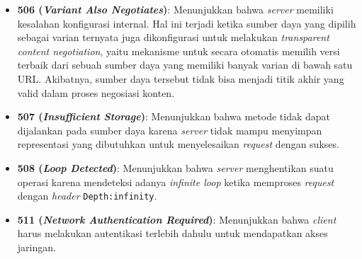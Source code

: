 \begin{itemize}
    \item \textbf{506 (\textit{Variant Also Negotiates})}: Menunjukkan bahwa \textit{server} memiliki kesalahan konfigurasi internal. Hal ini terjadi ketika sumber daya yang dipilih sebagai varian ternyata juga dikonfigurasi untuk melakukan \textit{transparent content negotiation}, yaitu mekanisme untuk secara otomatis memilih versi terbaik dari sebuah sumber daya yang memiliki banyak varian di bawah satu URL. Akibatnya, sumber daya tersebut tidak bisa menjadi titik akhir yang valid dalam proses negosiasi konten.~\cite{RFC2295}
  
    \item \textbf{507 (\textit{Insufficient Storage})}: Menunjukkan bahwa metode tidak dapat dijalankan pada sumber daya karena \textit{server} tidak mampu menyimpan representasi yang dibutuhkan untuk menyelesaikan \textit{request} dengan sukses.~\cite{RFC4918}
  
    \item \textbf{508 (\textit{Loop Detected})}: Menunjukkan bahwa \textit{server} menghentikan suatu operasi karena mendeteksi adanya \textit{infinite loop} ketika memproses \textit{request} dengan \textit{header} \texttt{Depth:infinity}.~\cite{RFC5842}
  
    \item \textbf{511 (\textit{Network Authentication Required})}: Menunjukkan bahwa \textit{client} harus melakukan autentikasi terlebih dahulu untuk mendapatkan akses jaringan.~\cite{RFC6585}
  
\end{itemize}

